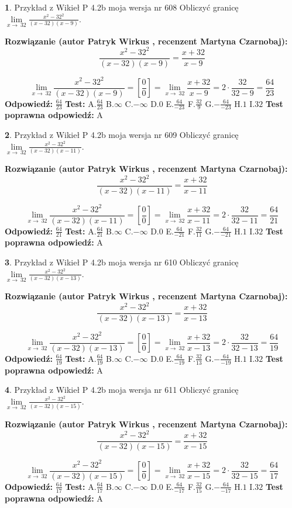 \documentclass[12pt, a4paper]{article}
\theoremstyle{definition} %
\newtheorem{zad}{}
\newcommand{\zadStart}[1]{\begin{zad}#1\newline}
\newcommand{\zadStop}{\end{zad}}
\newcommand{\rozwStart}[2]{\noindent \textbf{Rozwiązanie (autor #1 , recenzent #2): }\newline}
\newcommand{\rozwStop}{\newline}
\newcommand{\odpStart}{\noindent \textbf{Odpowiedź:}\newline}
\newcommand{\odpStop}{\newline}
\newcommand{\testStart}{\noindent \textbf{Test:}\newline}
\newcommand{\testStop}{\newline}
\newcommand{\kluczStart}{\noindent \textbf{Test poprawna odpowiedź:}\newline}
\newcommand{\kluczStop}{\newline}
\begin{document}
\zadStart{Przykład z Wikieł P 4.2b moja wersja nr 608}
Obliczyć granicę $\lim\limits_{x\to\ 32}\frac{x^{2}-32^{2}}{(x-32)(x-9)}$.
\zadStop
\rozwStart{Patryk Wirkus}{Martyna Czarnobaj}
$$\frac{x^{2}-32^{2}}{(x-32)(x-9)}=\frac{x+32}{x-9}$$

$$\lim\limits_{x\to\ 32}\frac{x^{2}-32^{2}}{(x-32)(x-9)}=[\frac{0}{0}]=\lim\limits_{x\to\ 32}\frac{x+32}{x-9}=2 \cdot \frac{32}{32-9} = \frac{64}{23}$$
\rozwStop
\odpStart
$\frac{64}{23}$
\odpStop
\testStart
A.$\frac{64}{23}$
B.$\infty$
C.$-\infty$
D.$0$
E.$\frac{64}{-23}$
F.$\frac{32}{9}$
G.$-\frac{64}{-23}$
H.$1$
I.$32$
\testStop
\kluczStart
A
\kluczStop



\zadStart{Przykład z Wikieł P 4.2b moja wersja nr 609}
Obliczyć granicę $\lim\limits_{x\to\ 32}\frac{x^{2}-32^{2}}{(x-32)(x-11)}$.
\zadStop
\rozwStart{Patryk Wirkus}{Martyna Czarnobaj}
$$\frac{x^{2}-32^{2}}{(x-32)(x-11)}=\frac{x+32}{x-11}$$

$$\lim\limits_{x\to\ 32}\frac{x^{2}-32^{2}}{(x-32)(x-11)}=[\frac{0}{0}]=\lim\limits_{x\to\ 32}\frac{x+32}{x-11}=2 \cdot \frac{32}{32-11} = \frac{64}{21}$$
\rozwStop
\odpStart
$\frac{64}{21}$
\odpStop
\testStart
A.$\frac{64}{21}$
B.$\infty$
C.$-\infty$
D.$0$
E.$\frac{64}{-21}$
F.$\frac{32}{11}$
G.$-\frac{64}{-21}$
H.$1$
I.$32$
\testStop
\kluczStart
A
\kluczStop



\zadStart{Przykład z Wikieł P 4.2b moja wersja nr 610}
Obliczyć granicę $\lim\limits_{x\to\ 32}\frac{x^{2}-32^{2}}{(x-32)(x-13)}$.
\zadStop
\rozwStart{Patryk Wirkus}{Martyna Czarnobaj}
$$\frac{x^{2}-32^{2}}{(x-32)(x-13)}=\frac{x+32}{x-13}$$

$$\lim\limits_{x\to\ 32}\frac{x^{2}-32^{2}}{(x-32)(x-13)}=[\frac{0}{0}]=\lim\limits_{x\to\ 32}\frac{x+32}{x-13}=2 \cdot \frac{32}{32-13} = \frac{64}{19}$$
\rozwStop
\odpStart
$\frac{64}{19}$
\odpStop
\testStart
A.$\frac{64}{19}$
B.$\infty$
C.$-\infty$
D.$0$
E.$\frac{64}{-19}$
F.$\frac{32}{13}$
G.$-\frac{64}{-19}$
H.$1$
I.$32$
\testStop
\kluczStart
A
\kluczStop



\zadStart{Przykład z Wikieł P 4.2b moja wersja nr 611}
Obliczyć granicę $\lim\limits_{x\to\ 32}\frac{x^{2}-32^{2}}{(x-32)(x-15)}$.
\zadStop
\rozwStart{Patryk Wirkus}{Martyna Czarnobaj}
$$\frac{x^{2}-32^{2}}{(x-32)(x-15)}=\frac{x+32}{x-15}$$

$$\lim\limits_{x\to\ 32}\frac{x^{2}-32^{2}}{(x-32)(x-15)}=[\frac{0}{0}]=\lim\limits_{x\to\ 32}\frac{x+32}{x-15}=2 \cdot \frac{32}{32-15} = \frac{64}{17}$$
\rozwStop
\odpStart
$\frac{64}{17}$
\odpStop
\testStart
A.$\frac{64}{17}$
B.$\infty$
C.$-\infty$
D.$0$
E.$\frac{64}{-17}$
F.$\frac{32}{15}$
G.$-\frac{64}{-17}$
H.$1$
I.$32$
\testStop
\kluczStart
A
\kluczStop
\end{document}
